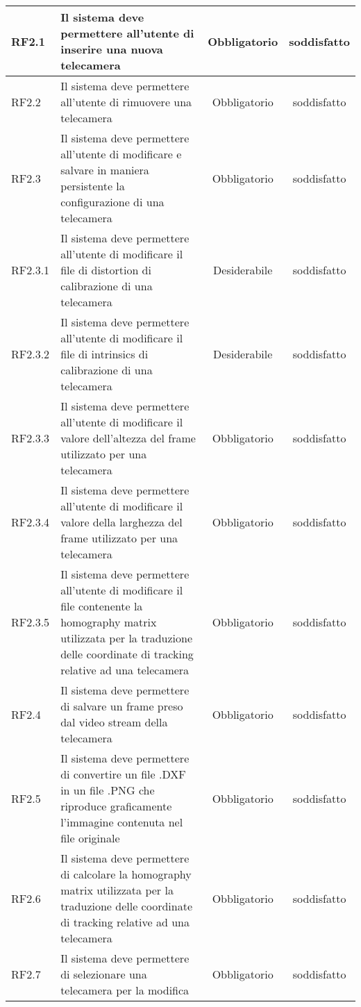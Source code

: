 \begin{center}
\begin{longtable}{ | l | p{5cm} | c | c |}
RF2.1 & Il sistema deve permettere all'utente di inserire una nuova telecamera & Obbligatorio &  \textcolor{green!80!blue}{soddisfatto}  \\ \hline 
RF2.2 & Il sistema deve permettere all'utente di rimuovere una telecamera & Obbligatorio &  \textcolor{green!80!blue}{soddisfatto}  \\ \hline 
RF2.3 & Il sistema deve permettere all'utente di modificare e salvare in maniera persistente la configurazione di una telecamera & Obbligatorio &  \textcolor{green!80!blue}{soddisfatto}  \\ \hline 
RF2.3.1 & Il sistema deve permettere all'utente di modificare il file di distortion di calibrazione di una telecamera & Desiderabile &  \textcolor{green!80!blue}{soddisfatto}  \\ \hline 
RF2.3.2 & Il sistema deve permettere all'utente di modificare il file di intrinsics di calibrazione di una telecamera & Desiderabile &  \textcolor{green!80!blue}{soddisfatto}  \\ \hline 
RF2.3.3 & Il sistema deve permettere all'utente di modificare il valore dell'altezza del frame utilizzato per una telecamera & Obbligatorio &  \textcolor{green!80!blue}{soddisfatto}  \\ \hline 
RF2.3.4 & Il sistema deve permettere all'utente di modificare il valore della larghezza del frame utilizzato per una telecamera & Obbligatorio &  \textcolor{green!80!blue}{soddisfatto}  \\ \hline 
RF2.3.5 & Il sistema deve permettere all'utente di modificare il file contenente la homography matrix utilizzata per la traduzione delle coordinate di tracking relative ad una telecamera & Obbligatorio &  \textcolor{green!80!blue}{soddisfatto}  \\ \hline 
RF2.4 & Il sistema deve permettere di salvare un frame preso dal video stream della telecamera & Obbligatorio &  \textcolor{green!80!blue}{soddisfatto}  \\ \hline 
RF2.5 & Il sistema deve permettere di convertire un file .DXF in un file .PNG che riproduce graficamente l'immagine contenuta nel file originale & Obbligatorio &  \textcolor{green!80!blue}{soddisfatto}  \\ \hline 
RF2.6 & Il sistema deve permettere di calcolare la homography matrix utilizzata per la traduzione delle coordinate di tracking relative ad una telecamera & Obbligatorio &  \textcolor{green!80!blue}{soddisfatto}  \\ \hline 
RF2.7 & Il sistema deve permettere di selezionare una telecamera per la modifica & Obbligatorio &  \textcolor{green!80!blue}{soddisfatto}  \\ \hline 

\end{longtable}
\end{center}
